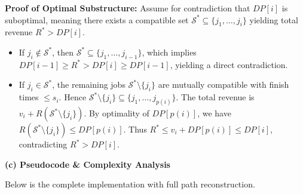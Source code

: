 \documentclass[11pt, a4paper]{article}
\newcommand{\solsection}[1]{\vspace{2pt}\noindent\textbf{\textcolor{primary}{#1}}\par\vspace{1pt}}
\begin{document}
\begin{solutionbox}
  \begin{proofbox}
    \textbf{Proof of Optimal Substructure:} Assume for contradiction that $DP[i]$ is suboptimal, meaning there exists a compatible set $\mathcal{S}^* \subseteq \{j_1, \dots, j_i\}$ yielding total revenue $R^* > DP[i]$.
    \begin{itemize}[leftmargin=1.2em, itemsep=0.5pt]
      \item If $j_i \notin \mathcal{S}^*$, then $\mathcal{S}^* \subseteq \{j_1, \dots, j_{i-1}\}$, which implies $DP[i-1] \ge R^* > DP[i] \ge DP[i-1]$, yielding a direct contradiction.
      \item If $j_i \in \mathcal{S}^*$, the remaining jobs $\mathcal{S}^* \setminus \{j_i\}$ are mutually compatible with finish times $\le s_i$. Hence $\mathcal{S}^* \setminus \{j_i\} \subseteq \{j_1, \dots, j_{p(i)}\}$. The total revenue is $v_i + R(\mathcal{S}^* \setminus \{j_i\})$. By optimality of $DP[p(i)]$, we have $R(\mathcal{S}^* \setminus \{j_i\}) \le DP[p(i)]$. Thus $R^* \le v_i + DP[p(i)] \le DP[i]$, contradicting $R^* > DP[i]$. \qedhere
    \end{itemize}
  \end{proofbox}

  \solsection{(c) Pseudocode \& Complexity Analysis}
  Below is the complete implementation with full path reconstruction.


\end{solutionbox}
\end{document}
